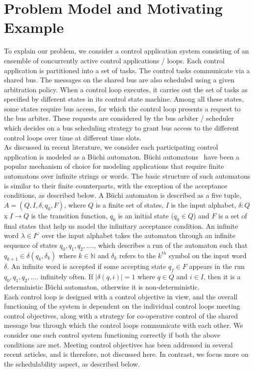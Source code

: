 \section{Problem Model and Motivating Example} \label{sec3}
\noindent
To explain our problem, we consider a control application system consisting of an ensemble of concurrently active control applications / loops. Each control application is partitioned into a set of
tasks. The control tasks communicate via a shared bus. The messages on the shared bus are also scheduled using a given arbitration policy. When a control loop executes, it carries out the set of tasks as specified by different states in its control state machine. Among all these states, some
states require bus access, for which the control loop presents a request to the bus arbiter. These requests are considered by the bus arbiter / scheduler which decides on a bus scheduling strategy to grant bus access to the different control loops over time at different time slots. \\

\noindent
As discussed in recent literature, we consider each participating control application is modeled as a B\"{u}chi automaton. B\"{u}chi automatons~\cite{leeuwen90/Thomas90} have been a popular mechanism of choice for modeling applications that require finite automatons over infinite strings or words. The basic structure of such automatons is similar to their finite counterparts, with the exception of the acceptance conditions, as described below.
A B\"{u}chi automaton is described as a five tuple, 
$A = (Q,I,\delta,q_0,F)$, where $Q$ is a finite set of states, $I$ is the input alphabet, $\delta : Q$ x $I \rightarrow Q $ is the transition function, $q_0$ 
is an initial state ($q_0 \in Q$) and $F$ is a set of final states that help us model the infinitary acceptance condition. An infinite word $\lambda \in I ^ \omega$ over the input alphabet takes the automaton through an infinite sequence of states $ q_0, q_1, q_2, ....$, which describes a run of
the automaton such that $ q_{k+1} \in \delta(q_k, \delta_k)$ where $k \in \mathbb{N}$ and $\delta_k$ refers to the $k^{th}$ symbol on the input 
word $\delta$. An infinite word is accepted if some 
accepting state $q_f \in F $ appears in the run $ q_0, q_1, q_2, ....$ 
infinitely often. If 
$|\delta(q,i)| = 1$ where $ q \in Q $ and $i \in I$, then it is a deterministic 
B\"{u}chi automaton, otherwise it is non-deterministic. \\

\noindent
Each control loop is designed with a control objective in view, and the overall functioning of the system is dependent on the individual control loops meeting control objectives, along with a strategy for co-operative control of the shared message bus through which the control loops communicate with each other. We consider one such control system functioning correctly if both the above conditions are met. Meeting control objectives has been addressed in several recent articles, and is therefore, not discussed here. In contrast, we focus more on the schedulability aspect, as described below. 

